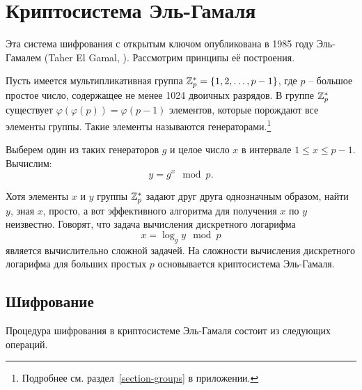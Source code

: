 \section{Криптосистема Эль-Гамаля}

Эта система шифрования с открытым ключом опубликована в 1985 году Эль-Гамалем (Taher El Gamal, \cite{ElGamal:1985}). Рассмотрим принципы её построения.

Пусть имеется мультипликативная группа $\mathbb{Z}_p^* = \{1, 2, \dots, p-1\}$, где $p$ -- большое простое число, содержащее не менее 1024 двоичных разрядов. В группе $\mathbb{Z}_p^*$ существует $\varphi( \varphi( p ) ) = \varphi( p - 1 )$ элементов, которые порождают все элементы группы. Такие элементы называются генераторами.\footnote{Подробнее см. раздел~\ref{section-groups} в приложении.}

Выберем один из таких генераторов $g$ и целое число $x$ в интервале $1 \le x \le p-1$. Вычислим:
    \[ y = g^x \mod p. \]

Хотя элементы $x$ и $y$ группы $\mathbb{Z}_p^*$ задают друг друга однозначным образом, найти $y$, зная $x$, просто, а вот эффективного алгоритма для получения $x$ по $y$ неизвестно. Говорят, что задача вычисления дискретного логарифма
	\[ x = \log_g y \mod p \]
является вычислительно сложной задачей. На сложности вычисления дискретного логарифма для больших простых $p$ основывается криптосистема Эль-Гамаля.

\subsection{Шифрование}

Процедура шифрования в криптосистеме Эль-Гамаля состоит из следующих операций.

